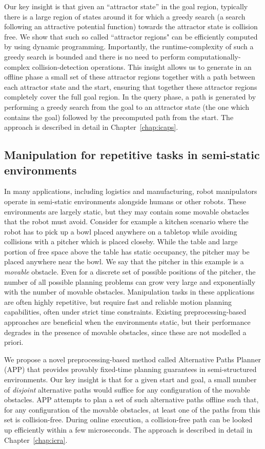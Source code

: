 \documentclass[a4paper]{report}
\begin{document}
Our key insight is that given an ``attractor state'' in the goal region, typically there is a large region of states around it for which a greedy search (a search following an attractive potential function) towards the attractor state is collision free. We show that such so called ``attractor regions" can be efficiently computed by using dynamic programming.
Importantly, the runtime-complexity of such a greedy search is bounded and there is no need to perform computationally-complex collision-detection operations. 
This insight allows us to generate in an offline phase a small set of these attractor regions together with a path between each attractor state and the start, ensuring that together these attractor regions completely cover the full goal region.
In the query phase, a path is generated by performing a greedy search from the goal to an attractor state (the one which contains the goal) followed by the precomputed path from the start. The approach is described in detail in Chapter~\ref{chap:icaps}.


\subsection{Manipulation for repetitive tasks in semi-static environments}
In many applications, including logistics and manufacturing, robot manipulators operate in semi-static environments alongside humans or other robots. These environments are largely static, but they may contain some movable obstacles that the robot must avoid.
Consider for example a kitchen scenario where the robot has to pick up a bowl placed anywhere on a tabletop while avoiding collisions with a pitcher which is placed closeby. While the table and large portion of free space above the table has static occupancy, the pitcher may be placed anywhere near the bowl. We say that the pitcher in this example is a \emph{movable} obstacle. Even for a discrete set of possible positions of the pitcher, the number of all possible planning problems can grow very large and exponentially with the number of movable obstacles.
Manipulation tasks in these applications are often highly repetitive, but require fast and reliable motion planning capabilities, often under strict time constraints. Existing preprocessing-based approaches are beneficial when the environments static, but their performance degrades in the presence of movable obstacles, since these are not modelled a priori.

We propose a novel preprocessing-based method called Alternative Paths Planner (APP) that provides provably fixed-time planning guarantees in semi-structured environments. Our key insight is that for a given start and goal, a small number of \emph{disjoint} alternative paths would suffice for any configuration of the movable obstacles. APP attempts to plan a set of such alternative paths offline such that, for any configuration of the movable obstacles, at least one of the paths from this set is collision-free. During online execution, a collision-free path can be looked up efficiently within a few microseconds. The approach is described in detail in Chapter~\ref{chap:icra}.
\end{document}
